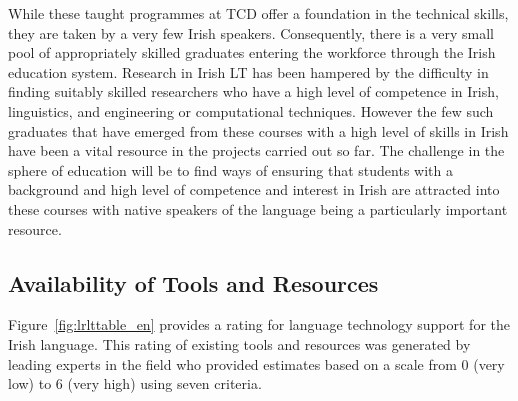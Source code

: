 \begin{multicols}{2}
While these taught programmes at TCD offer a foundation in the technical skills, they are taken by a very few Irish speakers. Consequently, there is a very small pool of appropriately skilled graduates entering the workforce through the Irish education system. Research in Irish LT has been hampered by the difficulty in finding suitably skilled researchers who have a high level of competence in Irish, linguistics, and engineering or computational techniques. However the few such graduates that have emerged from these courses with a high level of skills in Irish have been a vital resource in the projects carried out so far. The challenge in the sphere of education will be to find ways of ensuring that students with a background and high level of competence and interest in Irish are attracted into these courses with native speakers of the language being a particularly important resource. 



\subsection{Availability of Tools and Resources}

Figure~\ref{fig:lrlttable_en} provides a rating for language technology support for the Irish language. This rating of existing tools and resources was generated by leading experts in the field who provided estimates based on a scale from 0 (very low) to 6 (very high) using seven criteria.


\end{multicols}
